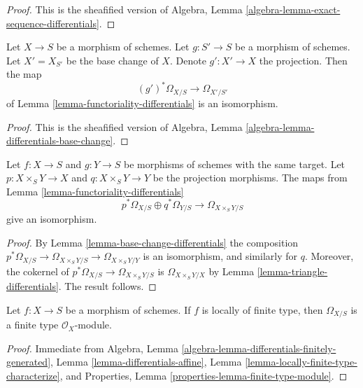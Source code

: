 \begin{proof}
This is the sheafified version of
Algebra, Lemma \ref{algebra-lemma-exact-sequence-differentials}.
\end{proof}

\begin{lemma}
\label{lemma-base-change-differentials}
Let $X \to S$ be a morphism of schemes.
Let $g : S' \to S$ be a morphism of schemes.
Let $X' = X_{S'}$ be the base change of $X$.
Denote $g' : X' \to X$ the projection.
Then the map
$$
(g')^*\Omega_{X/S} \to \Omega_{X'/S'}
$$
of Lemma \ref{lemma-functoriality-differentials} is an isomorphism.
\end{lemma}

\begin{proof}
This is the sheafified version of
Algebra, Lemma \ref{algebra-lemma-differentials-base-change}.
\end{proof}

\begin{lemma}
\label{lemma-differential-product}
Let $f : X \to S$ and $g : Y \to S$ be morphisms of schemes with the same
target. Let $p : X \times_S Y \to X$ and $q : X \times_S Y \to Y$ be the
projection morphisms. The maps from
Lemma \ref{lemma-functoriality-differentials}
$$
p^*\Omega_{X/S} \oplus q^*\Omega_{Y/S}
\longrightarrow
\Omega_{X \times_S Y/S}
$$
give an isomorphism.
\end{lemma}

\begin{proof}
By Lemma \ref{lemma-base-change-differentials} the composition
$p^*\Omega_{X/S} \to \Omega_{X \times_S Y/S} \to \Omega_{X \times_S Y/Y}$
is an isomorphism, and similarly for $q$. Moreover, the cokernel
of $p^*\Omega_{X/S} \to \Omega_{X \times_S Y/S}$ is
$\Omega_{X \times_S Y/X}$ by
Lemma \ref{lemma-triangle-differentials}. The result follows.
\end{proof}

\begin{lemma}
\label{lemma-finite-type-differentials}
Let $f : X \to S$ be a morphism of schemes.
If $f$ is locally of finite type, then $\Omega_{X/S}$ is
a finite type $\mathcal{O}_X$-module.
\end{lemma}

\begin{proof}
Immediate from
Algebra, Lemma \ref{algebra-lemma-differentials-finitely-generated},
Lemma \ref{lemma-differentials-affine},
Lemma \ref{lemma-locally-finite-type-characterize}, and
Properties, Lemma \ref{properties-lemma-finite-type-module}.
\end{proof}

